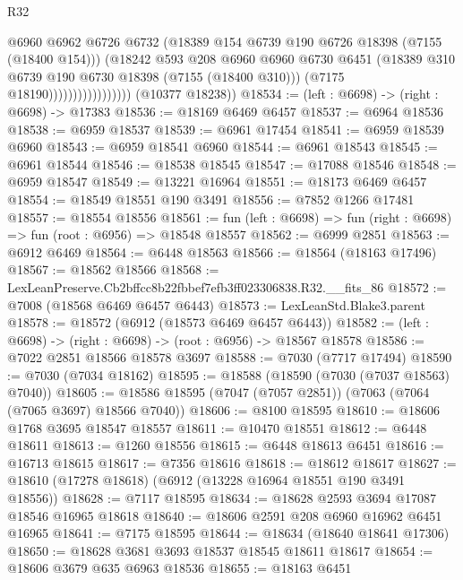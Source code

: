 \begin{lexlean}{R32}
\begin{coremodule}
                                    @6960
                                    @6962
                                    @6726
                                    @6732
                                    (@18389 @154 @6739 @190 @6726 @18398 (@7155 (@18400 @154)))
                                    (@18242
                                      @593
                                      @208
                                      @6960
                                      @6960
                                      @6730
                                      @6451
                                      (@18389 @310 @6739 @190 @6730 @18398 (@7155 (@18400 @310)))
                                      (@7175 @18190)))))))))))))))))
      (@10377 @18238))
@18534 := (left : @6698) -> (right : @6698) -> @17383
@18536 := @18169 @6469 @6457
@18537 := @6964 @18536
@18538 := @6959 @18537
@18539 := @6961 @17454
@18541 := @6959 @18539 @6960
@18543 := @6959 @18541 @6960
@18544 := @6961 @18543
@18545 := @6961 @18544
@18546 := @18538 @18545
@18547 := @17088 @18546
@18548 := @6959 @18547
@18549 := @13221 @16964
@18551 := @18173 @6469 @6457
@18554 := @18549 @18551 @190 @3491
@18556 := @7852 @1266 @17481
@18557 := @18554 @18556
@18561 := fun (left : @6698) => fun (right : @6698) => fun (root : @6956) => @18548 @18557
@18562 := @6999 @2851
@18563 := @6912 @6469
@18564 := @6448 @18563
@18566 := @18564 (@18163 @17496)
@18567 := @18562 @18566
@18568 := LexLeanPreserve.Cb2bffcc8b22fbbef7efb3ff023306838.R32.__fits_86
@18572 := @7008 (@18568 @6469 @6457 @6443)
@18573 := LexLeanStd.Blake3.parent
@18578 := @18572 (@6912 (@18573 @6469 @6457 @6443))
@18582 := (left : @6698) -> (right : @6698) -> (root : @6956) -> @18567 @18578
@18586 := @7022 @2851 @18566 @18578 @3697
@18588 := @7030 (@7717 @17494)
@18590 := @7030 (@7034 @18162)
@18595 := @18588 (@18590 (@7030 (@7037 @18563) @7040))
@18605 := @18586 @18595 (@7047 (@7057 @2851)) (@7063 (@7064 (@7065 @3697) @18566 @7040))
@18606 := @8100 @18595
@18610 := @18606 @1768 @3695 @18547 @18557
@18611 := @10470 @18551
@18612 := @6448 @18611
@18613 := @1260 @18556
@18615 := @6448 @18613 @6451
@18616 := @16713 @18615
@18617 := @7356 @18616
@18618 := @18612 @18617
@18627 := @18610 (@17278 @18618) (@6912 (@13228 @16964 @18551 @190 @3491 @18556))
@18628 := @7117 @18595
@18634 := @18628 @2593 @3694 @17087 @18546 @16965 @18618
@18640 := @18606 @2591 @208 @6960 @16962 @6451 @16965
@18641 := @7175 @18595
@18644 := @18634 (@18640 @18641 @17306)
@18650 := @18628 @3681 @3693 @18537 @18545 @18611 @18617
@18654 := @18606 @3679 @635 @6963 @18536
@18655 := @18163 @6451

\end{coremodule}
\end{lexlean}
